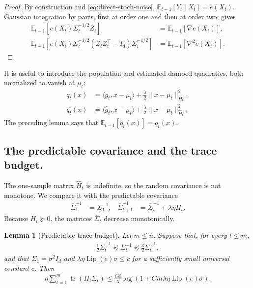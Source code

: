 \documentclass{article}
\theoremstyle{plain}
\newtheorem{lemma}[theorem]{Lemma}
\theoremstyle{definition}
\theoremstyle{plain}
\newcommand{\tr}{\operatorname{tr}}
\newcommand{\E}{\mathbb E}
\begin{document}
\begin{proof}
    By construction and \eqref{eq:direct-stoch-noise}, $\E_{t-1}[Y_t\mid X_t]=e(X_t)$.
    Gaussian integration by parts, first at order one and then at order
    two, gives
    \begin{align}
        \E_{t-1}\left[
            e(X_t)\Sigma_t^{-1/2}Z_t
            \right]
         & =\E_{t-1}[\nabla e(X_t)],
        \\
        \E_{t-1}\left[
            e(X_t)\Sigma_t^{-1/2}
            (Z_tZ_t^\top-I_d)\Sigma_t^{-1/2}
            \right]
         & =\E_{t-1}[\nabla^2e(X_t)].
    \end{align}
\end{proof}

It is useful to introduce the population and estimated damped
quadratics, both normalized to vanish at $\mu_t$:
\begin{align}
    q_t(x)
     & =\langle g_t,x-\mu_t\rangle
    +\frac\lambda2\|x-\mu_t\|_{H_t}^2,
    \\
    \widehat q_t(x)
     & =\langle\widehat g_t,x-\mu_t\rangle
    +\frac\lambda2\|x-\mu_t\|_{\widehat H_t}^2.
    \label{eq:direct-stoch-quadratics}
\end{align}
The preceding lemma says that $\E_{t-1}[\widehat q_t(x)]=q_t(x)$.

\subsection{The predictable covariance and the trace budget.}
The one-sample matrix $\widehat H_t$ is indefinite, so the random
covariance is not monotone.  We compare it with the predictable
covariance
\begin{align}
    \overline\Sigma_1^{-1} & =\Sigma_1^{-1},
                           &
    \overline\Sigma_{t+1}^{-1}
                           & =\overline\Sigma_t^{-1}+\lambda\eta H_t.
    \label{eq:direct-stoch-reference-covariance}
\end{align}
Because $H_t\succeq0$, the matrices $\overline\Sigma_t$ decrease
monotonically.

\begin{lemma}[Predictable trace budget]
    \label{lem:direct-stoch-trace}
    Let $m\leq n$.  Suppose that, for every $t\leq m$,
    \begin{align}
        \frac12\overline\Sigma_t^{-1}
        \preceq\Sigma_t^{-1}
        \preceq\frac32\overline\Sigma_t^{-1},
        \label{eq:direct-stoch-covariance-comparison}
    \end{align}
    and that $\Sigma_1=\sigma^2I_d$ and
    $\lambda\eta\operatorname{Lip}(e)\sigma\leq c$ for a sufficiently
    small universal constant $c$.  Then
    \begin{align}
        \eta\sum_{t=1}^m\tr(H_t\Sigma_t)
        \leq
        \frac{Cd}{\lambda}
        \log\left(
        1+Cm\lambda\eta\operatorname{Lip}(e)\sigma
        \right).
        \label{eq:direct-stoch-reference-trace}
    \end{align}
\end{lemma}
\end{document}
